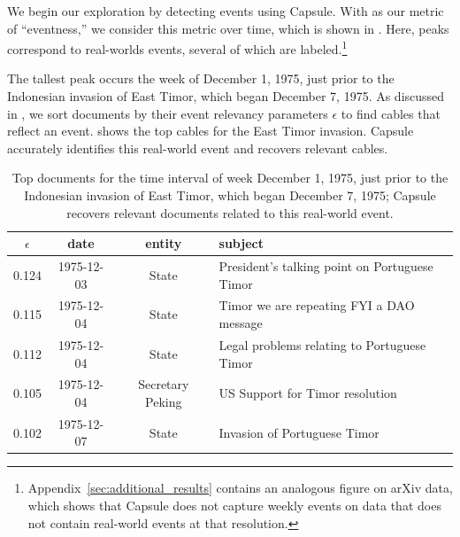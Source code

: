 We begin our exploration by detecting events using Capsule.  With  as our metric of ``eventness,'' we consider this metric over time, which is shown in .  Here, peaks correspond to real-worlds events, several of which are labeled.\footnote{Appendix~\ref{sec:additional_results} contains an analogous figure on arXiv data, which shows that Capsule does not capture weekly events on data that does not contain real-world events at that resolution.}

The tallest peak occurs the week of December 1, 1975, just prior to the Indonesian invasion of East Timor, which began December 7, 1975.  As discussed in , we sort documents by their event relevancy parameters $\epsilon$ to find cables that reflect an event.   shows the top cables for the East Timor invasion.  Capsule accurately identifies this real-world event and recovers relevant cables.

\begin{table}[tb]
\small
\centering
\begin{tabular}{cccl}
\toprule
$\epsilon$ & date & entity & subject \\
\midrule
0.124   &  1975-12-03  &  State  & President's talking point on Portuguese Timor \\
0.115   &  1975-12-04  &  State  & Timor we are repeating FYI a DAO message \\
0.112   &  1975-12-04  &  State  &  Legal problems relating to Portuguese Timor\\
0.105   &  1975-12-04  &  Secretary Peking & US Support for Timor resolution \\
0.102   &  1975-12-07  &  State  & Invasion of Portuguese Timor \\
\bottomrule
\end{tabular}
\label{tab:timor}
\caption{Top documents for the time interval of week December 1, 1975, just prior to the Indonesian invasion of East Timor, which began December 7, 1975; Capsule recovers relevant documents related to this real-world event.}
\end{table}

